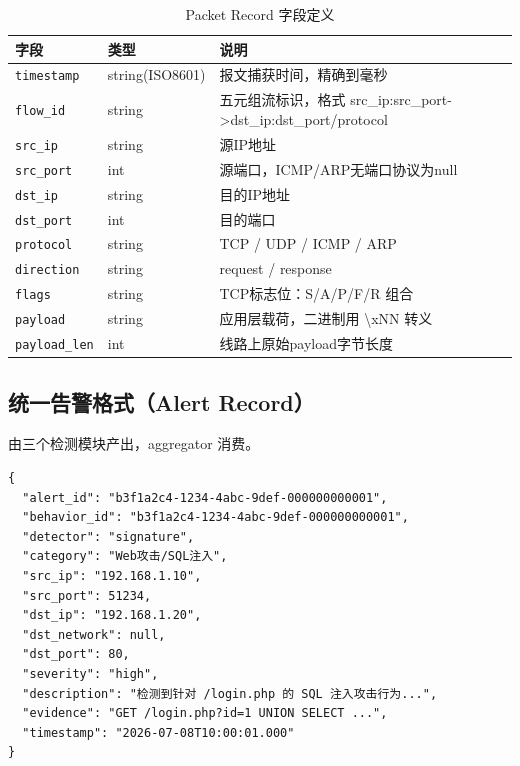 \documentclass[12pt,a4paper]{ctexart}
\begin{document}
\begin{table}[H]
\centering
\caption{Packet Record 字段定义}
\small
\begin{tabular}{@{}lp{2.5cm}p{7cm}@{}}
\toprule
字段 & 类型 & 说明 \\
\midrule
\texttt{timestamp}  & string(ISO8601) & 报文捕获时间，精确到毫秒 \\
\texttt{flow\_id}    & string & 五元组流标识，格式 src\_ip:src\_port->dst\_ip:dst\_port/protocol \\
\texttt{src\_ip}     & string & 源IP地址 \\
\texttt{src\_port}   & int    & 源端口，ICMP/ARP无端口协议为null \\
\texttt{dst\_ip}     & string & 目的IP地址 \\
\texttt{dst\_port}   & int    & 目的端口 \\
\texttt{protocol}    & string & TCP / UDP / ICMP / ARP \\
\texttt{direction}   & string & request / response \\
\texttt{flags}       & string & TCP标志位：S/A/P/F/R 组合 \\
\texttt{payload}     & string & 应用层载荷，二进制用 \textbackslash xNN 转义 \\
\texttt{payload\_len}& int    & 线路上原始payload字节长度 \\
\bottomrule
\end{tabular}
\end{table}

\subsection{统一告警格式（Alert Record）}

由三个检测模块产出，aggregator 消费。

\begin{lstlisting}
{
  "alert_id": "b3f1a2c4-1234-4abc-9def-000000000001",
  "behavior_id": "b3f1a2c4-1234-4abc-9def-000000000001",
  "detector": "signature",
  "category": "Web攻击/SQL注入",
  "src_ip": "192.168.1.10",
  "src_port": 51234,
  "dst_ip": "192.168.1.20",
  "dst_network": null,
  "dst_port": 80,
  "severity": "high",
  "description": "检测到针对 /login.php 的 SQL 注入攻击行为...",
  "evidence": "GET /login.php?id=1 UNION SELECT ...",
  "timestamp": "2026-07-08T10:00:01.000"
}
\end{lstlisting}
\end{document}
